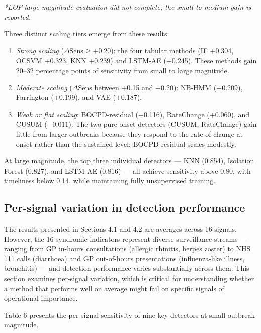 \documentclass[11pt]{article}
\begin{document}
\noindent\textit{*LOF large-magnitude evaluation did not complete; the small-to-medium gain is reported.}

\medskip

Three distinct scaling tiers emerge from these results:

\begin{enumerate}
\item \textit{Strong scaling} ($\Delta\text{Sens} \geq +0.20$): the four tabular methods (IF +0.304, OCSVM +0.323, KNN +0.239) and LSTM-AE (+0.245). These methods gain 20--32 percentage points of sensitivity from small to large magnitude.

\item \textit{Moderate scaling} ($\Delta\text{Sens}$ between +0.15 and +0.20): NB-HMM (+0.209), Farrington (+0.199), and VAE (+0.187).

\item \textit{Weak or flat scaling}: BOCPD-residual (+0.116), RateChange (+0.060), and CUSUM ($-0.011$). The two pure onset detectors (CUSUM, RateChange) gain little from larger outbreaks because they respond to the rate of change at onset rather than the sustained level; BOCPD-residual scales modestly.
\end{enumerate}

At large magnitude, the top three individual detectors --- KNN (0.854), Isolation Forest (0.827), and LSTM-AE (0.816) --- all achieve sensitivity above 0.80, with timeliness below 0.14, while maintaining fully unsupervised training.

\subsection{Per-signal variation in detection performance}

The results presented in Sections 4.1 and 4.2 are averages across 16 signals. However, the 16 syndromic indicators represent diverse surveillance streams --- ranging from GP in-hours consultations (allergic rhinitis, herpes zoster) to NHS 111 calls (diarrhoea) and GP out-of-hours presentations (influenza-like illness, bronchitis) --- and detection performance varies substantially across them. This section examines per-signal variation, which is critical for understanding whether a method that performs well on average might fail on specific signals of operational importance.

Table 6 presents the per-signal sensitivity of nine key detectors at small outbreak magnitude.
\end{document}
